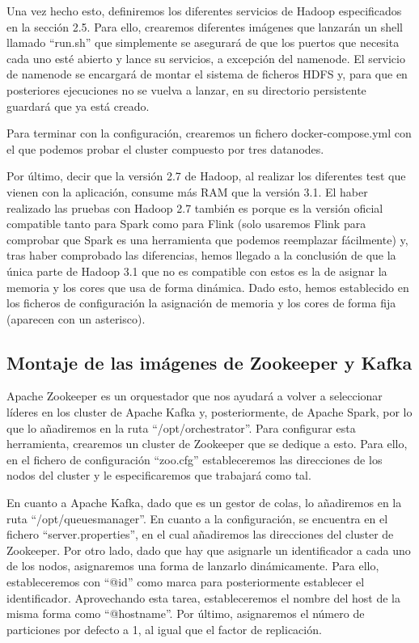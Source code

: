 Una vez hecho esto, definiremos los diferentes servicios de Hadoop especificados en la sección 2.5. Para ello, crearemos diferentes imágenes que lanzarán un shell llamado “run.sh” que simplemente se asegurará de que los puertos que necesita cada uno esté abierto y lance su servicios, a excepción del namenode. El servicio de namenode se encargará de montar el sistema de ficheros HDFS y, para que en posteriores ejecuciones no se vuelva a lanzar, en su directorio persistente guardará que ya está creado.

Para terminar con la configuración, crearemos un fichero docker-compose.yml con el que podemos probar el cluster compuesto por tres datanodes.

Por último, decir que la versión 2.7 de Hadoop, al realizar los diferentes test que vienen con la aplicación, consume más RAM que la versión 3.1. El haber realizado las pruebas con Hadoop 2.7 también es porque es la versión oficial compatible tanto para Spark como para Flink (solo usaremos Flink para comprobar que Spark es una herramienta que podemos reemplazar fácilmente) y, tras haber comprobado las diferencias, hemos llegado a la conclusión de que la única parte de Hadoop 3.1 que no es compatible con estos es la de asignar la memoria y los cores que usa de forma dinámica. Dado esto, hemos establecido en los ficheros de configuración la asignación de memoria y los cores de forma fija (aparecen con un asterisco).


\subsection {Montaje de las imágenes de Zookeeper y Kafka\label{montKafka}}
Apache Zookeeper es un orquestador que nos ayudará a volver a seleccionar líderes en los cluster de Apache Kafka y, posteriormente, de Apache Spark, por lo que lo añadiremos en la ruta “/opt/orchestrator”. Para configurar esta herramienta, crearemos un cluster de Zookeeper que se dedique a esto. Para ello, en el fichero de configuración “zoo.cfg” estableceremos las direcciones de los nodos del cluster y le especificaremos que trabajará como tal.

En cuanto a Apache Kafka, dado que es un gestor de colas, lo añadiremos en la ruta “/opt/queuesmanager”. En cuanto a la configuración, se encuentra en el fichero “server.properties”, en el cual añadiremos las direcciones del cluster de Zookeeper. Por otro lado, dado que hay que asignarle un identificador a cada uno de los nodos, asignaremos una forma de lanzarlo dinámicamente. Para ello, estableceremos con “@id” como marca para posteriormente establecer el identificador. Aprovechando esta tarea, estableceremos el nombre del host de la misma forma como “@hostname”.  Por último, asignaremos el número de particiones por defecto a 1, al igual que el factor de replicación.


